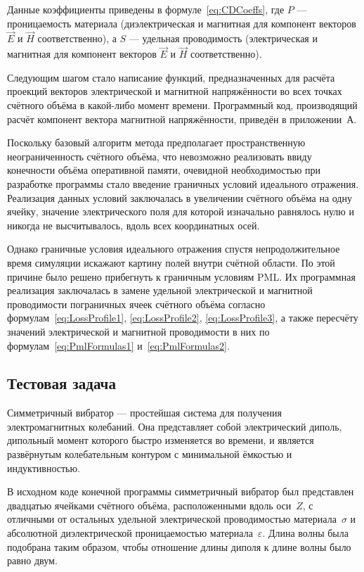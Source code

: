 Данные коэффициенты приведены в формуле~\eqref{eq:CDCoeffs}, где $ P $ --- проницаемость материала (диэлектрическая и магнитная для компонент векторов $\vec{E}$  и $\vec{H}$ соответственно), а $S$ --- удельная проводимость (электрическая и магнитная для компонент векторов $\vec{E}$  и $\vec{H}$ соответственно).

Следующим шагом стало написание функций, предназначенных для расчёта проекций векторов электрической и магнитной напряжённости во всех точках счётного объёма в какой-либо момент времени. Программный код, производящий расчёт компонент вектора магнитной напряжённости, приведён в приложении~А.

Поскольку базовый алгоритм метода предполагает пространственную неограниченность счётного объёма, что невозможно реализовать ввиду конечности объёма оперативной памяти, очевидной необходимостью при разработке программы стало введение граничных условий идеального отражения. Реализация данных условий заключалась в увеличении счётного объёма на одну ячейку, значение электрического поля для которой изначально равнялось нулю и никогда не высчитывалось, вдоль всех координатных осей.

Однако граничные условия идеального отражения спустя непродолжительное время симуляции искажают картину полей внутри счётной области. По этой причине было решено прибегнуть к граничным условиям PML. Их программная реализация заключалась в замене удельной электрической и магнитной проводимости пограничных ячеек счётного объёма согласно формулам~\eqref{eq:LossProfile1}, \eqref{eq:LossProfile2}, \eqref{eq:LossProfile3}, а также пересчёту значений электрической и магнитной проводимости в них по формулам~\eqref{eq:PmlFormulas1} и~\eqref{eq:PmlFormulas2}.

\subsection{Тестовая задача}

Симметричный вибратор --- простейшая система для получения электромагнитных колебаний. Она представляет собой электрический диполь, дипольный момент которого быстро изменяется во времени, и является развёрнутым колебательным контуром с минимальной ёмкостью и индуктивностью.

В исходном коде конечной программы симметричный вибратор был представлен двадцатью ячейками счётного объёма, расположенными вдоль оси~$ Z $, с отличными от остальных удельной электрической проводимостью материала~$\sigma$
и абсолютной диэлектрической проницаемостью материала~$\varepsilon$. Длина волны была подобрана таким образом, чтобы отношение длины диполя к длине волны было равно двум.

